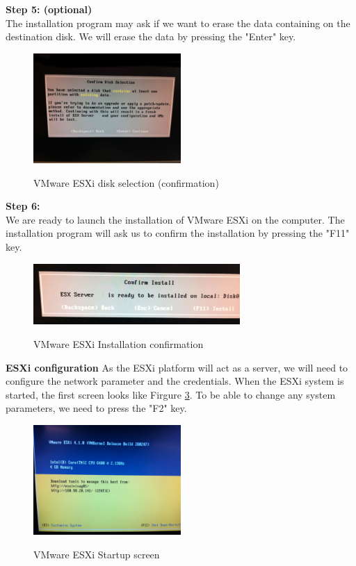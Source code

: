 \pagebreak
\textbf{Step 5: (optional)}\\
The installation program may ask if we want to erase the data containing on the destination disk. We will erase the data by pressing the "Enter" key. 
\begin{figure}[ht]
	\caption{VMware ESXi disk selection (confirmation)}
  	\centering
	\includegraphics[width=0.5\textwidth]{./pic/esxi_5.jpg}
	\label{fig:kex_object_creation}
\end{figure}

\textbf{Step 6:}\\
We are ready to launch the installation of VMware ESXi on the computer. The installation program will ask us to confirm the installation by pressing the "F11" key. 
\begin{figure}[ht]
	\caption{VMware ESXi Installation confirmation}
  	\centering
	\includegraphics[width=0.7\textwidth]{./pic/esxi_6.jpg}
	\label{fig:kex_object_creation}
\end{figure}


\pagebreak
\textbf{ESXi configuration}
As the ESXi platform will act as a server, we will need to configure the network parameter and the credentials. When the ESXi system is started, the first screen looks like Firgure \ref{fig:esxi_first_screen}. To be able to change any system parameters, we need to press the "F2" key.\s

\begin{figure}[ht]
	\caption{VMware ESXi Startup screen}
  	\centering
	\includegraphics[width=0.5\textwidth]{./pic/esxi_7.jpg}
	\label{fig:esxi_first_screen}
\end{figure}

